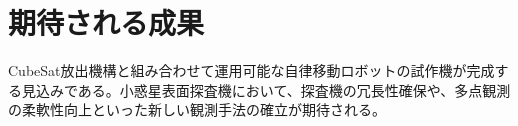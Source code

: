 \documentclass[dvipdfmx,titlepage,a4j]{jsarticle}
\begin{document}
\section{期待される成果}
CubeSat放出機構と組み合わせて運用可能な自律移動ロボットの試作機が完成する見込みである。小惑星表面探査機において、探査機の冗長性確保や、多点観測の柔軟性向上といった新しい観測手法の確立が期待される。

\nocite{*}


\end{document}
